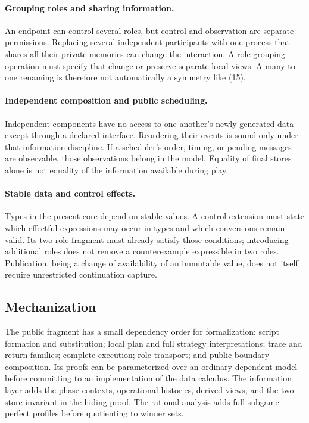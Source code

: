 \paragraph{Grouping roles and sharing information.}
An endpoint can control several roles, but control and observation are separate
permissions. Replacing several independent participants with one process that
shares all their private memories can change the interaction. A role-grouping
operation must specify that change or preserve separate local views. A
many-to-one renaming is therefore not automatically a symmetry like (15).

\paragraph{Independent composition and public scheduling.}
Independent components have no access to one another's newly generated data
except through a declared interface. Reordering their events is sound only
under that information discipline. If a scheduler's order, timing, or pending
messages are observable, those observations belong in the model. Equality of
final stores alone is not equality of the information available during play.

\paragraph{Stable data and control effects.}
Types in the present core depend on stable values. A control extension must
state which effectful expressions may occur in types and which conversions
remain valid. Its two-role fragment must already satisfy those conditions;
introducing additional roles does not remove a counterexample expressible in
two roles. Publication, being a change of availability of an immutable value,
does not itself require unrestricted continuation capture.

\subsection{Mechanization}

The public fragment has a small dependency order for formalization:
script formation and substitution; local plan and full strategy
interpretations; trace and return families; complete execution; role
transport; and public boundary composition.
Its proofs can be parameterized over an ordinary dependent model before
committing to an implementation of the data calculus. The information layer
adds the phase contexts, operational histories, derived views, and the
two-store invariant in the hiding proof. The rational analysis adds full
subgame-perfect profiles before quotienting to winner sets.


